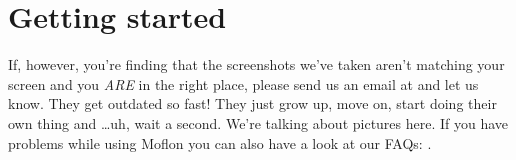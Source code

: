 \chapter{Getting started}
\genHeader 

If, however, you're finding that the screenshots we've taken aren't matching your screen and you \emph{ARE} in the right place, please send us an email at
\eMoflonContact{} and let us know. They get outdated so fast! They just grow up, move on, start doing their own thing and
\ldots uh, wait a second. We're talking about pictures here.
\newline
If you have problems while using Moflon you can also have a look at our FAQs: .
